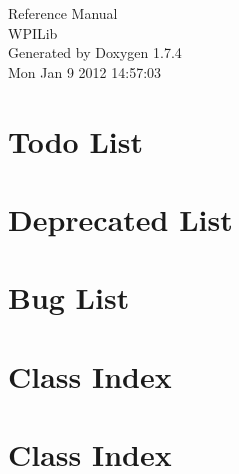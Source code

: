 \documentclass[a4paper]{book}
\begin{document}
\hypersetup{pageanchor=false}
\begin{titlepage}
\vspace*{7cm}
\begin{center}
{\Large Reference Manual\\[1ex]\large WPILib }\\
\vspace*{1cm}
{\large Generated by Doxygen 1.7.4}\\
\vspace*{0.5cm}
{\small Mon Jan 9 2012 14:57:03}\\
\end{center}
\end{titlepage}
\clearemptydoublepage
{}
\tableofcontents
\clearemptydoublepage
{}
\hypersetup{pageanchor=true}
\chapter{Todo List}
\label{todo}
\hypertarget{todo}{}

\chapter{Deprecated List}
\label{deprecated}
\hypertarget{deprecated}{}

\chapter{Bug List}
\label{bug}
\hypertarget{bug}{}

\chapter{Class Index}

\chapter{Class Index}

\end{document}
